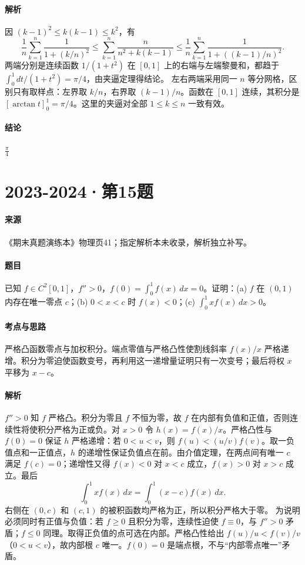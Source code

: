\documentclass[UTF8,fontset=fandol,12pt,oneside,openany]{ctexrep}
\theoremstyle{definition}
\begin{document}
\paragraph{解析}
因 $(k-1)^2\le k(k-1)\le k^2$，有 \[\frac1n\sum_{k=1}^n\frac1{1+(k/n)^2}\le\sum_{k=1}^n\frac{n}{n^2+k(k-1)}\le\frac1n\sum_{k=1}^n\frac1{1+((k-1)/n)^2}.\]两端分别是连续函数 $1/(1+t^2)$ 在 $[0,1]$ 上的右端与左端黎曼和，都趋于 $\int_0^1dt/(1+t^2)=\pi/4$，由夹逼定理得结论。
左右两端采用同一 $n$ 等分网格，区别只有取样点：左界取 $k/n$，右界取 $(k-1)/n$。函数在 $[0,1]$ 连续，其积分是 $[\arctan t]_0^1=\pi/4$。这里的夹逼对全部 $1\le k\le n$ 一致有效。
\paragraph{结论}
$\frac\pi4$

\par\addvspace{18pt}\noindent\begin{minipage}{\linewidth}
\section{2023-2024·第15题}
\label{exam:11:q6}
\paragraph{来源} 《期末真题演练本》物理页41；指定解析本未收录，解析独立补写。
\paragraph{题目}
已知 $f\in C^2[0,1]$，$f''>0$，$f(0)=\int_0^1 f(x)\,dx=0$。证明：(a) $f$ 在 $(0,1)$ 内存在唯一零点 $c$；(b) $0<x<c$ 时 $f(x)<0$；(c) $\int_0^1xf(x)\,dx>0$。
\end{minipage}\par
\paragraph{考点与思路}
严格凸函数零点与加权积分。端点零值与严格凸性使割线斜率 $f(x)/x$ 严格递增。积分为零迫使函数变号，再利用这一递增量证明只有一次变号；最后将权 $x$ 平移为 $x-c$。
\paragraph{解析}
$f''>0$ 知 $f$ 严格凸。积分为零且 $f$ 不恒为零，故 $f$ 在内部有负值和正值，否则连续性将使积分严格为正或负。对 $x>0$ 令 $h(x)=f(x)/x$。严格凸性与 $f(0)=0$ 保证 $h$ 严格递增：若 $0<u<v$，则 $f(u)<(u/v)f(v)$。取一负值点和一正值点，$h$ 的递增性保证负值点在前。由介值定理，在两点间有唯一 $c$ 满足 $f(c)=0$；递增性又得 $f(x)<0$ 对 $x<c$ 成立，$f(x)>0$ 对 $x>c$ 成立。最后
\[\int_0^1xf(x)\,dx=\int_0^1(x-c)f(x)\,dx.\]
右侧在 $(0,c)$ 和 $(c,1)$ 的被积函数均严格为正，所以积分严格大于零。
为说明必须同时有正值与负值：若 $f\ge0$ 且积分为零，连续性迫使 $f\equiv0$，与 $f''>0$ 矛盾；$f\le0$ 同理。取得正负值的点可选在内部。严格凸性给出 $f(u)/u<f(v)/v$（$0<u<v$），故内部根 $c$ 唯一。$f(0)=0$ 是端点根，不与“内部零点唯一”矛盾。
\end{document}
